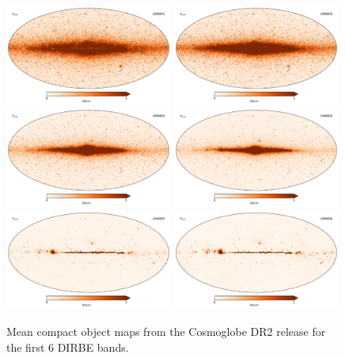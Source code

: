 \documentclass{aa}
\begin{document}
\begin{figure}
  \centering
  \includegraphics[width=0.49\textwidth]{figs/starmaps/all_stars_mean_01.pdf}
  \includegraphics[width=0.49\textwidth]{figs/starmaps/all_stars_mean_02.pdf} \\
  \includegraphics[width=0.49\textwidth]{figs/starmaps/all_stars_mean_03.pdf}
  \includegraphics[width=0.49\textwidth]{figs/starmaps/all_stars_mean_04.pdf} \\
  \includegraphics[width=0.49\textwidth]{figs/starmaps/all_stars_mean_05.pdf}
  \includegraphics[width=0.49\textwidth]{figs/starmaps/all_stars_mean_06.pdf} \\
  \caption{Mean compact object maps from the Cosmoglobe DR2 release for the first 6 DIRBE bands. }
  \label{fig:starsT}
\end{figure}
\end{document}
